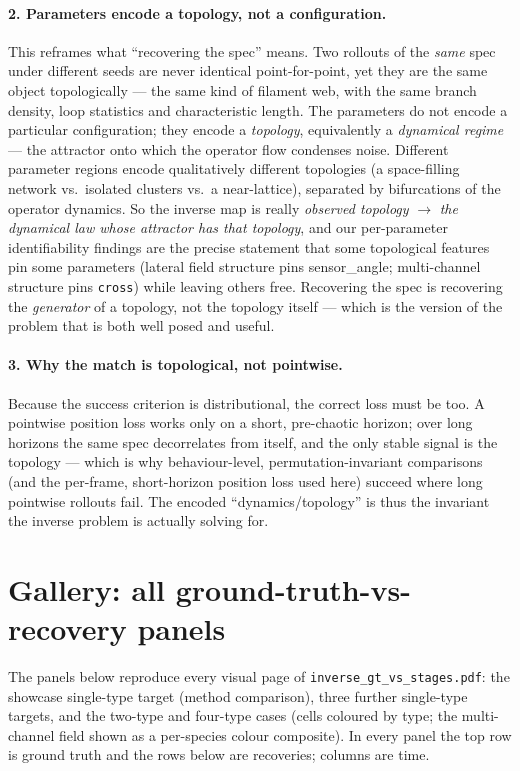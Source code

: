 \documentclass[11pt]{article}
\newcommand{\code}[1]{\texttt{#1}}
\newcommand{\op}[1]{\textcolor{cop}{\texttt{#1}}}
\begin{document}
\paragraph{2. Parameters encode a topology, not a configuration.} This reframes what
``recovering the spec'' means. Two rollouts of the \emph{same} spec under different
seeds are never identical point-for-point, yet they are the same object topologically
--- the same kind of filament web, with the same branch density, loop statistics and
characteristic length. The parameters do not encode a particular configuration; they
encode a \emph{topology}, equivalently a \emph{dynamical regime} --- the attractor onto
which the operator flow condenses noise. Different parameter regions encode
qualitatively different topologies (a space-filling network vs.\ isolated clusters vs.\
a near-lattice), separated by bifurcations of the operator dynamics. So the inverse map
is really \emph{observed topology} $\to$ \emph{the dynamical law whose attractor has
that topology}, and our per-parameter identifiability findings are the precise statement
that some topological features pin some parameters (lateral field structure pins
sensor\_angle; multi-channel structure pins \op{cross}) while leaving others free.
Recovering the spec is recovering the \emph{generator} of a topology, not the topology
itself --- which is the version of the problem that is both well posed and useful.

\paragraph{3. Why the match is topological, not pointwise.} Because the success
criterion is distributional, the correct loss must be too. A pointwise position loss
works only on a short, pre-chaotic horizon; over long horizons the same spec decorrelates
from itself, and the only stable signal is the topology --- which is why behaviour-level,
permutation-invariant comparisons (and the per-frame, short-horizon position loss used
here) succeed where long pointwise rollouts fail. The encoded ``dynamics/topology'' is
thus the invariant the inverse problem is actually solving for.

\clearpage
\section*{Gallery: all ground-truth-vs-recovery panels}
The panels below reproduce every visual page of \code{inverse\_gt\_vs\_stages.pdf}:
the showcase single-type target (method comparison), three further single-type
targets, and the two-type and four-type cases (cells coloured by type; the
multi-channel field shown as a per-species colour composite). In every panel the top
row is ground truth and the rows below are recoveries; columns are time.


\end{document}
